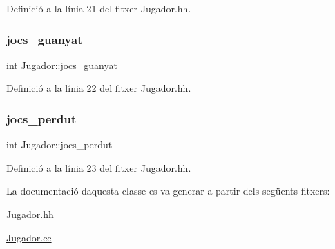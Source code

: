 Definició a la línia 21 del fitxer Jugador.\+hh.

\mbox{\label{class_jugador_a0eb97835e7dd3143f626c1d15edb7392}} 
\subsubsection{\texorpdfstring{jocs\+\_\+guanyat}{jocs\_guanyat}}
{\footnotesize\ttfamily int Jugador\+::jocs\+\_\+guanyat\hspace{0.3cm}{\ttfamily [private]}}



Definició a la línia 22 del fitxer Jugador.\+hh.

\mbox{\label{class_jugador_a04e5cf90e57c490b4c088e29763479f7}} 
\subsubsection{\texorpdfstring{jocs\+\_\+perdut}{jocs\_perdut}}
{\footnotesize\ttfamily int Jugador\+::jocs\+\_\+perdut\hspace{0.3cm}{\ttfamily [private]}}



Definició a la línia 23 del fitxer Jugador.\+hh.



La documentació d\textquotesingle{}aquesta classe es va generar a partir dels següents fitxers\+:\begin{DoxyCompactItemize}
\item 
\mbox{\hyperlink{_jugador_8hh}{Jugador.\+hh}}\item 
\mbox{\hyperlink{_jugador_8cc}{Jugador.\+cc}}\end{DoxyCompactItemize}
